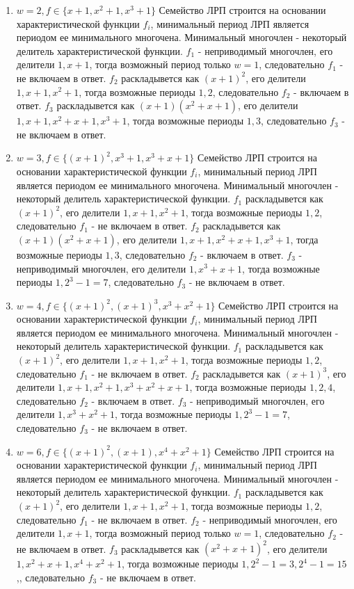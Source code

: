 \documentclass[12pt]{extarticle}
\begin{document}
\begin{enumerate}
    \item $w=2, f\in \{x+1, x^2+1, x^3+1\}$
    Семейство ЛРП строится на основании характеристической функции $f_i$, минимальный период ЛРП является периодом ее минимального многочена. Минимальный многочлен - некоторый делитель характеристической функции. $f_1$ - неприводимый многочлен, его делители $1, x+1$, тогда возможный период только $w=1$, следовательно $f_1$ - не включаем в ответ. $f_2$ раскладывется как $(x+1)^2$, его делители $1, x+1, x^2+1$, тогда возможные периоды $1, 2$, следовательно $f_2$ - включаем в ответ. $f_3$ раскладывется как $(x+1)(x^2+x+1)$, его делители $1, x+1, x^2+x+1, x^3+1$, тогда возможные периоды $1, 3$, следовательно $f_3$ - не включаем в ответ. 
    
    \item $w=3, f\in \{(x+1)^2, x^3+1, x^3+x+1\}$
    Семейство ЛРП строится на основании характеристической функции $f_i$, минимальный период ЛРП является периодом ее минимального многочена. Минимальный многочлен - некоторый делитель характеристической функции. $f_1$ раскладывется как $(x+1)^2$, его делители $1, x+1, x^2+1$, тогда возможные периоды $1, 2$, следовательно $f_1$ - не включаем в ответ. $f_2$ раскладывется как $(x+1)(x^2+x+1)$, его делители $1, x+1, x^2+x+1, x^3+1$, тогда возможные периоды $1, 3$, следовательно $f_2$ - включаем в ответ. $f_3$ - неприводимый многочлен, его делители $1, x^3+x+1$, тогда возможные периоды $1, 2^3-1=7$, следовательно $f_3$ - не включаем в ответ. 
    
    \item $w=4, f\in \{(x+1)^2, (x+1)^3, x^3+x^2+1\}$
    Семейство ЛРП строится на основании характеристической функции $f_i$, минимальный период ЛРП является периодом ее минимального многочена. Минимальный многочлен - некоторый делитель характеристической функции. $f_1$ раскладывется как $(x+1)^2$, его делители $1, x+1, x^2+1$, тогда возможные периоды $1, 2$, следовательно $f_1$ - не включаем в ответ. $f_2$ раскладывется как $(x+1)^3$, его делители $1, x+1, x^2+1, x^3+x^2+x+1$, тогда возможные периоды $1, 2, 4$, следовательно $f_2$ - включаем в ответ. $f_3$ - неприводимый многочлен, его делители $1, x^3+x^2+1$, тогда возможные периоды $1, 2^3-1=7$, следовательно $f_3$ - не включаем в ответ. 
    
    \item $w=6, f\in \{(x+1)^2, (x+1), x^4+x^2+1\}$
    Семейство ЛРП строится на основании характеристической функции $f_i$, минимальный период ЛРП является периодом ее минимального многочена. Минимальный многочлен - некоторый делитель характеристической функции. $f_1$ раскладывется как $(x+1)^2$, его делители $1, x+1, x^2+1$, тогда возможные периоды $1, 2$, следовательно $f_1$ - не включаем в ответ. $f_2$ - неприводимый многочлен, его делители $1, x+1$, тогда возможный период только $w=1$, следовательно $f_2$ - не включаем в ответ. $f_3$ раскладывется как $(x^2+x+1)^2$, его делители $1, x^2+x+1, x^4+x^2+1$, тогда возможные периоды $1, 2^2-1=3, 2^4-1=15$,, следовательно $f_3$ - не включаем в ответ. 
    

\end{enumerate}
\end{document}

